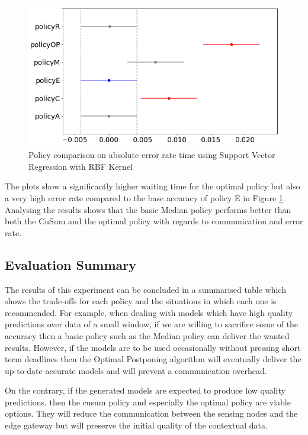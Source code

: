 \documentclass{mpaper}
\begin{document}
\begin{figure}[h]
    \centering
    \includegraphics[scale=0.35]{imgs/svr_rbf_R5_error_plot_diff_means.png}
    \caption{Policy comparison on absolute error rate time using Support Vector Regression with RBF Kernel}
    \label{fig:svr_rbf_R5_error_plot_diff_means}
\end{figure}

The plots show a significantly higher waiting time for the optimal policy but also a very high error rate compared to the base accuracy of policy E in Figure \ref{fig:svr_rbf_R5_error_plot_diff_means}. Analysing the results shows that the basic Median policy performs better than both the CuSum and the optimal policy with regards to communication and error rate.

\subsection{Evaluation Summary}
The results of this experiment can be concluded in a summarised table which shows the trade-offs for each policy and the situations in which each one is recommended. 
For example, when dealing with models which have high quality predictions over data of a small window, if we are willing to sacrifice some of the accuracy then a basic policy such as the Median policy can deliver the wanted results. However, if the models are to be used occasionally without pressing short term deadlines then the Optimal Postponing algorithm will eventually deliver the up-to-date accurate models and will prevent a communication overhead.

On the contrary, if the generated models are expected to produce low quality predictions, then the cusum policy and especially the optimal policy are viable options. They will reduce the communication between the sensing nodes and the edge gateway but will preserve the initial quality of the contextual data.
\end{document}
